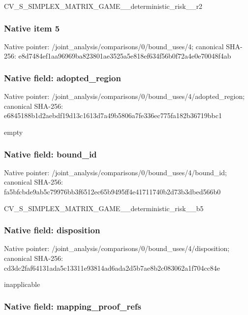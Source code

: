 \documentclass[10pt,a4paper]{article}
\begin{document}
CV\_S\_SIMPLEX\_MATRIX\_GAME\allowbreak{}\_\_deterministic\_risk\_\_r2


\subsubsection{Native item 5}


Native pointer: /joint\_analysis/comparis\allowbreak{}ons/0/bound\_uses/4; canonical SHA-256: e8d7484ef1aa96969ba82380\allowbreak{}1ae3525a5e818ef634f56b0f\allowbreak{}72a4e0e70048f4ab



\subsubsection{Native field: adopted\_region}


Native pointer: /joint\_analysis/comparis\allowbreak{}ons/0/bound\_uses/4/adopt\allowbreak{}ed\_region; canonical SHA-256: e6845188b1d2aebdf19d13c1\allowbreak{}613d7a49b5806a7fe336ec77\allowbreak{}5fa182b36719bbc1


empty


\subsubsection{Native field: bound\_id}


Native pointer: /joint\_analysis/comparis\allowbreak{}ons/0/bound\_uses/4/bound\allowbreak{}\_id; canonical SHA-256: fa5bfcbde9ab5c79976bb3f6\allowbreak{}512ec65b9495ff4e41711740\allowbreak{}b2d73b3dbed566b0


CV\_S\_SIMPLEX\_MATRIX\_GAME\allowbreak{}\_\_deterministic\_risk\_\_b5


\subsubsection{Native field: disposition}


Native pointer: /joint\_analysis/comparis\allowbreak{}ons/0/bound\_uses/4/dispo\allowbreak{}sition; canonical SHA-256: cd3dc2faf64131ada5c13311\allowbreak{}e93814ad6ada2d5b7ae8b2c0\allowbreak{}83062a1f704cc84e


inapplicable


\subsubsection{Native field: mapping\_proof\_refs}
\end{document}
